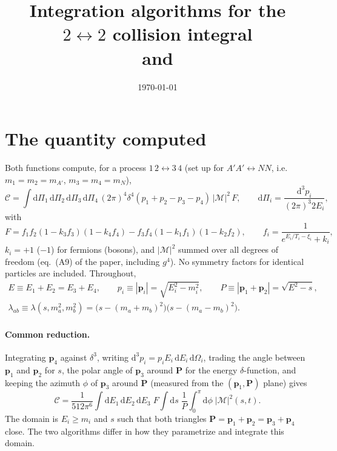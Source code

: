 \documentclass[11pt,a4paper]{article}
\title{\texorpdfstring{Integration algorithms for the $2\leftrightarrow2$ collision integral\\
\large \code{coll\_12\_34} and \code{coll\_12\_34\_legendre}}{Integration algorithms for the 2-2 collision integral}}
\author{}
\date{\today}
\newcommand{\dd}{\mathrm{d}}
\newcommand{\Msq}{|\mathcal{M}|^2}
\begin{document}
\maketitle

\section{The quantity computed}

Both functions compute, for a process $1\,2\leftrightarrow3\,4$ (set up for
$A'A'\leftrightarrow NN$, i.e.\ $m_1=m_2=m_{A'}$, $m_3=m_4=m_N$),
\begin{equation}
  \mathcal{C} = \int \dd\Pi_1\,\dd\Pi_2\,\dd\Pi_3\,\dd\Pi_4\,
  (2\pi)^4\delta^4(p_1+p_2-p_3-p_4)\,\Msq\,F ,
  \qquad \dd\Pi_i = \frac{\dd^3p_i}{(2\pi)^3 2E_i},
  \label{eq:C}
\end{equation}
with
\begin{equation}
  F = f_1 f_2 (1-k_3 f_3)(1-k_4 f_4) - f_3 f_4 (1-k_1 f_1)(1-k_2 f_2),
  \qquad
  f_i = \frac{1}{e^{E_i/T_i-\xi_i}+k_i},
\end{equation}
$k_i=+1$ ($-1$) for fermions (bosons), and $\Msq$ summed over all degrees of
freedom (eq.~(A9) of the paper, including $g^4$). No symmetry factors for
identical particles are included. Throughout,
\begin{gather}
  E \equiv E_1+E_2 = E_3+E_4,\qquad
  p_i\equiv|\mathbf{p}_i| = \sqrt{E_i^2-m_i^2},\qquad
  P\equiv|\mathbf{p}_1+\mathbf{p}_2| = \sqrt{E^2-s},\\
  \lambda_{ab}\equiv\lambda(s,m_a^2,m_b^2)
  = \big(s-(m_a+m_b)^2\big)\big(s-(m_a-m_b)^2\big).
\end{gather}

\paragraph{Common reduction.}
Integrating $\mathbf{p}_4$ against $\delta^3$, writing
$\dd^3p_i = p_iE_i\,\dd E_i\,\dd\Omega_i$, trading the angle between
$\mathbf{p}_1$ and $\mathbf{p}_2$ for $s$, the polar angle of $\mathbf{p}_3$
around $\mathbf{P}$ for the energy $\delta$-function, and keeping the azimuth
$\phi$ of $\mathbf{p}_3$ around $\mathbf{P}$ (measured from the
$(\mathbf{p}_1,\mathbf{P})$ plane) gives
\begin{equation}
  \mathcal{C} = \frac{1}{512\pi^6}\int\dd E_1\,\dd E_2\,\dd E_3\;F
  \int\dd s\;\frac{1}{P}\int_0^\pi\dd\phi\;\Msq(s,t).
  \label{eq:reduced}
\end{equation}
The domain is $E_i\ge m_i$ and $s$ such that both triangles
$\mathbf{P}=\mathbf{p}_1+\mathbf{p}_2=\mathbf{p}_3+\mathbf{p}_4$ close. The
two algorithms differ in how they parametrize and integrate this domain.
\end{document}
